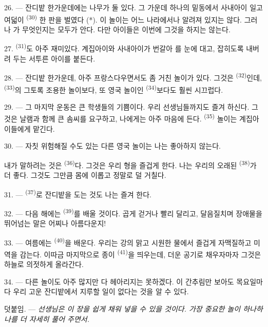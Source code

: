 26. --- 잔디밭 한가운데에는 나무가 둘 있다. 그 가운데 하나의 밑동에서 사내아이 일고여덟이
\textsuperscript{(30)} 한 판을 벌였다 (*). 이 놀이는 어느 나라에서나
알려져 있지는 않다. 그러나 가 무엇인지는 모두가 안다. 다만
아이들은 이번에 그것을 하지는 않는다.

\VUsaut{5.0mm}
\VUsaut{3.4mm}

27. \textsuperscript{(31)}도 아주 재미있다. 계집아이와 사내아이가 번갈아
를 눈에 대고, 잡히도록 내버려 두는 서투른 아이를 붙든다.

28. --- 잔디밭 한가운데, 아주 프랑스다우면서도 좀 거친 놀이가 있다. 그것은
\textsuperscript{(32)}인데, \textsuperscript{(33)}의 그토록
조용한 놀이보다, 또 영국 놀이인 \textsuperscript{(34)}보다도 훨씬 시끄럽다.

29. --- 그 마지막 운동은 큰 학생들의 기쁨이다. 우리 선생님들까지도 즐겨 하신다. 그것은
날램과 함께 큰 솜씨를 요구하고, 나에게는 아주 마음에 든다.
\textsuperscript{(35)} 놀이는 계집아이들에게 맡긴다.

30. --- 자칫 위험해질 수도 있는 다른 영국 놀이는 나는 좋아하지 않는다.

내가 말하려는 것은 \textsuperscript{(36)}다. 그것은 우리 형을 즐겁게 한다.
나는 우리의 오래된 \textsuperscript{(38)}가 더 좋다. 그것도 그만큼
몸에 이롭고 정말로 덜 거칠다.

\VUsaut{4.6mm}
\VUsaut{3.0mm}

31. --- \textsuperscript{(37)}로 잔디밭을 도는 것도 나는 즐겨 한다.

32. --- 다음 해에는 \textsuperscript{(39)}를 배울 것이다. 곱게 걷거나
빨리 달리고, 달음질치며 장애물을 뛰어넘는 말은 어찌나 아름다운지!

33. --- 여름에는 \textsuperscript{(40)}을 배운다. 우리는 강의 맑고 시원한
물에서 즐겁게 자맥질하고 미역을 감는다. 이따금 마지막으로 종이
\textsuperscript{(41)}을 띄우는데, 더운 공기로 채우자마자 그것은 하늘로
의젓하게 올라간다.

34. --- 다른 놀이도 아주 많지만 다 헤아리지는 못하겠다. 이 간추림만 보아도 목요일마다
우리 고운 잔디밭에서 지루할 일이 없다는 것을 알 수 있다.

덧붙임. --- \textit{선생님은 이 장을 쉽게 채워 넣을 수 있을 것이다. 가장 중요한 놀이
하나하나를 더 자세히 풀어 주면서.}
